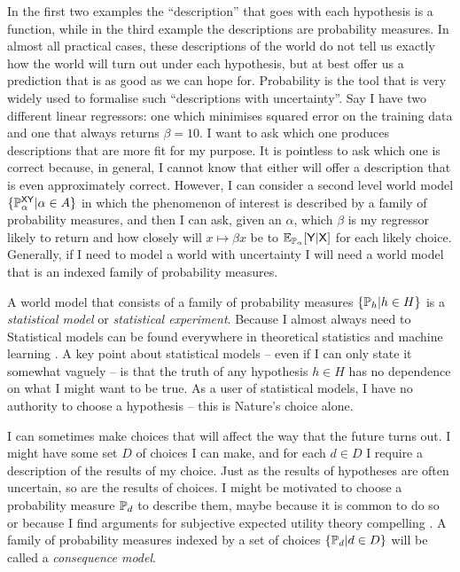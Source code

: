 In the first two examples the ``description'' that goes with each hypothesis is a function, while in the third example the descriptions are probability measures. In almost all practical cases, these descriptions of the world do not tell us exactly how the world will turn out under each hypothesis, but at best offer us a prediction that is as good as we can hope for. Probability is the tool that is very widely used to formalise such ``descriptions with uncertainty''. Say I have two different linear regressors: one which minimises squared error on the training data and one that always returns $\beta=10$. I want to ask which one produces descriptions that are more fit for my purpose. It is pointless to ask which one is correct because, in general, I cannot know that either will offer a description that is even approximately correct. However, I can consider a second level world model $\{\mathbb{P}^{\mathsf{X}\mathsf{Y}}_\alpha|\alpha\in A\}$ in which the phenomenon of interest is described by a family of probability measures, and then I can ask, given an $\alpha$, which $\beta$ is my regressor likely to return and how closely will $x\mapsto \beta x$ be to $\mathbb{E}_{\mathbb{P}_\alpha}[\mathsf{Y}|\mathsf{X}]$ for each likely choice. Generally, if I need to model a world with uncertainty I will need a world model that is an indexed family of probability measures.

A world model that consists of a family of probability measures $\{\mathbb{P}_h|h\in H\}$ is a \emph{statistical model} or \emph{statistical experiment}. Because I almost always need to Statistical models can be found everywhere in theoretical statistics and machine learning \cite{fisher_statistical_1992,le_cam_comparison_1996,freedman_asymptotic_1963,de_finetti_foresight_1992,vapnik_nature_2013,wald_statistical_1950}. A key point about statistical models -- even if I can only state it somewhat vaguely -- is that the truth of any hypothesis $h\in H$ has no dependence on what I might want to be true. As a user of statistical models, I have no authority to choose a hypothesis -- this is Nature's choice alone. 

I can sometimes make choices that will affect the way that the future turns out. I might have some set $D$ of choices I can make, and for each $d\in D$ I require a description of the results of my choice. Just as the results of hypotheses are often uncertain, so are the results of choices. I might be motivated to choose a probability measure $\mathbb{P}_d$ to describe them, maybe because it is common to do so or because I find arguments for subjective expected utility theory compelling \citep{steele_decision_2020}. A family of probability measures indexed by a set of choices $\{\mathbb{P}_d|d\in D\}$ will be called a \emph{consequence model}.

